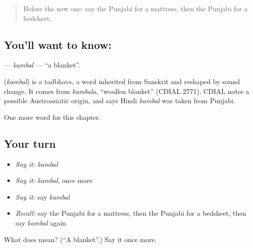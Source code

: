 \label{lesson:PA-C114-kambal}



\begin{quote}
Before the new one: say the Punjabi for a mattress, then the Punjabi for a bedsheet.
\end{quote}

\subsection*{You'll want to know: }
\textbf{} — \emph{kambal} — \textquotedblleft{}a blanket\textquotedblright{}.

\begin{cousinweb}
\textbf{} (\emph{kambal}) is a tadbhava, a word inherited from Sanskrit and reshaped by sound change. It comes from \emph{kambala}, \textquotedblleft{}woollen blanket\textquotedblright{} (CDIAL 2771). CDIAL notes a possible Austroasiatic origin, and says Hindi \emph{kambal} was taken from Punjabi.
\end{cousinweb}

\begin{grammarlens}[title={What you've built}]
One more word for this chapter.
\end{grammarlens}

\subsection*{Your turn}
\begin{itemize}
\raggedright
  \item \emph{Say it:} \emph{kambal}
  \item \emph{Say it:} \emph{kambal}, once more
  \item \emph{Say it:} say \emph{kambal}
  \item \emph{Recall:} say the Punjabi for a mattress, then the Punjabi for a bedsheet, then say \emph{kambal} again
\end{itemize}

\begin{tcolorbox}[breakable,colback=teal!4,colframe=teal!35!black,title={Before you move on}]
What does  mean? (\textquotedblleft{}A blanket\textquotedblright{}.) Say it once more.
\end{tcolorbox}
